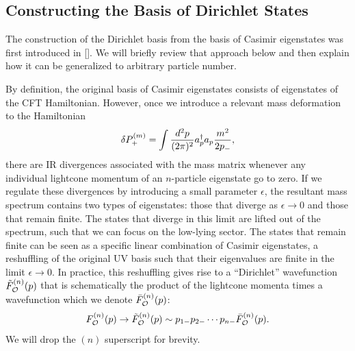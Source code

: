  

\begin{subappendices}

\section{Constructing the Basis of Dirichlet States}
\label{sec:ConstructingBasis}


The construction of the Dirichlet basis from the basis of Casimir eigenstates was first introduced in []. We will briefly review that approach below and then explain how it can be generalized to arbitrary particle number.

By definition, the original basis of Casimir eigenstates consists of eigenstates of the CFT Hamiltonian. However, once we introduce a relevant mass deformation to the Hamiltonian \begin{equation}
	\delta P_+^{(m)} = \int \frac{d^2 p}{(2\pi)^2} a^\dagger_p a_p \frac{m^2}{2 p_-},
\end{equation} there are IR divergences associated with the mass matrix whenever any individual lightcone momentum of an $n$-particle eigenstate go to zero. If we regulate these divergences by introducing a small parameter $\epsilon$, the resultant mass spectrum contains two types of eigenstates: those that diverge as $\epsilon \to 0$ and those that remain finite. The states that diverge in this limit are lifted out of the spectrum, such that we can focus on the low-lying sector. The states that remain finite can be seen as a specific linear combination of Casimir eigenstates, a reshuffling of the original UV basis such that their eigenvalues are finite in the limit $\epsilon \to 0$. In practice, this reshuffling gives rise to a ``Dirichlet'' wavefunction $\tilde{F}_{{\cal O}}^{(n)}(p)$ that is schematically the product of the lightcone momenta times a wavefunction which we denote $\bar{F}_{{\cal O}}^{(n)}(p)$: \begin{equation}
	F_{{\cal O}}^{(n)}(p) \to \tilde{F}_{{\cal O}}^{(n)}(p) \sim p_{1-} p_{2-} \dotsb p_{n-} \bar{F}_{{\cal O}}^{(n)}(p). \label{dirshuffle}
\end{equation} We will drop the $(n)$ superscript for brevity. 


\end{subappendices}
